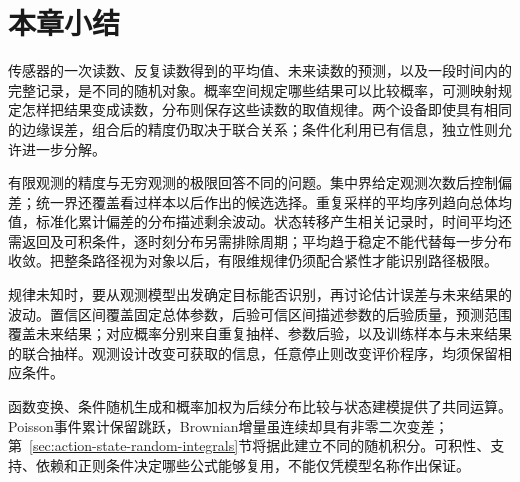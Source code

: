 \section{本章小结}
\label{sec:probability-summary}
\label{sec:stochastic-processes-and-approximation-summary}
\label{sec:statistics-summary}

传感器的一次读数、反复读数得到的平均值、未来读数的预测，以及一段时间内的完整记录，是不同的随机对象。概率空间规定哪些结果可以比较概率，可测映射规定怎样把结果变成读数，分布则保存这些读数的取值规律。两个设备即使具有相同的边缘误差，组合后的精度仍取决于联合关系；条件化利用已有信息，独立性则允许进一步分解。

有限观测的精度与无穷观测的极限回答不同的问题。集中界给定观测次数后控制偏差；统一界还覆盖看过样本以后作出的候选选择。重复采样的平均序列趋向总体均值，标准化累计偏差的分布描述剩余波动。状态转移产生相关记录时，时间平均还需返回及可积条件，逐时刻分布另需排除周期；平均趋于稳定不能代替每一步分布收敛。把整条路径视为对象以后，有限维规律仍须配合紧性才能识别路径极限。

规律未知时，要从观测模型出发确定目标能否识别，再讨论估计误差与未来结果的波动。置信区间覆盖固定总体参数，后验可信区间描述参数的后验质量，预测范围覆盖未来结果；对应概率分别来自重复抽样、参数后验，以及训练样本与未来结果的联合抽样。观测设计改变可获取的信息，任意停止则改变评价程序，均须保留相应条件。

函数变换、条件随机生成和概率加权为后续分布比较与状态建模提供了共同运算。Poisson事件累计保留跳跃，Brownian增量虽连续却具有非零二次变差；第~\ref{sec:action-state-random-integrals}节将据此建立不同的随机积分。可积性、支持、依赖和正则条件决定哪些公式能够复用，不能仅凭模型名称作出保证。
